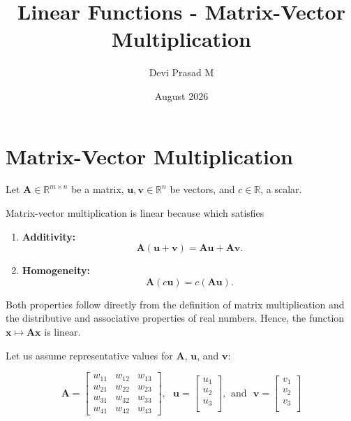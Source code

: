 \documentclass[12pt]{article}
\title{Linear Functions - Matrix-Vector Multiplication}
\author{Devi Prasad M}
\date{August 2026}
\newcommand{\vsp}{\vspace*{1em}}
\begin{document}
\pagecolor{yellow!10}

\maketitle

\section{Matrix-Vector Multiplication}


Let $\mathbf{A} \in \mathbb{R}^{m \times n}$ be a matrix,
$\mathbf{u}, \mathbf{v} \in \mathbb{R}^n$ be vectors,
and $c \in \mathbb{R}$, a scalar.

\vsp

\noindent Matrix-vector multiplication is linear because which satisfies
\begin{enumerate}
    \item \textbf{Additivity:}
    \[
        \mathbf{A}(\mathbf{u} + \mathbf{v}) = \mathbf{A} \mathbf{u} + \mathbf{A} \mathbf{v}.
    \]

    \item \textbf{Homogeneity:}
    \[
        \mathbf{A}(c\mathbf{u}) = c(\mathbf{A} \mathbf{u}).
    \]
\end{enumerate}

\noindent Both properties follow directly from the definition of matrix multiplication and the distributive and associative properties of real numbers.
Hence, the function $\mathbf{x} \mapsto \mathbf{A}\mathbf{x}$ is linear.

\vsp

\noindent Let us assume representative values for $\mathbf{A}$, $\mathbf{u}$, and $\mathbf{v}$:

\[
    \mathbf{A} = \begin{bmatrix}
        w_{11} & w_{12} & w_{13} \\
        w_{21} & w_{22} & w_{23} \\
        w_{31} & w_{32} & w_{33} \\
        w_{41} & w_{42} & w_{43}
    \end{bmatrix}
    ,\ \ \
    \mathbf{u} = \begin{bmatrix}
        u_1 \\
        u_2 \\
        u_3 \\
    \end{bmatrix}
    ,\ \, \mathrm{and} \ \ \
    \mathbf{v} = \begin{bmatrix}
        v_1 \\
        v_2 \\
        v_3 \\
    \end{bmatrix}
\]
\end{document}
